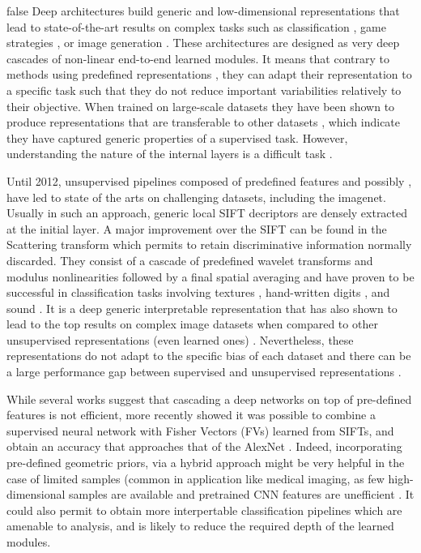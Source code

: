 \documentclass[10pt,twocolumn,letterpaper]{article}
\newcommand{\citep}{\cite}
\begin{document}
\if false
Deep architectures build generic and low-dimensional representations that lead to state-of-the-art results on complex tasks such as classification \citep{he2015deep},  game strategies  \citep{silver2016mastering}, or image generation \citep{radford2015unsupervised}.
These architectures are designed as very deep cascades of non-linear end-to-end learned modules. It means that contrary to methods using predefined representations \cite{ref}, they can adapt their representation to a specific task such that they do not reduce important variabilities relatively to their objective. When trained on large-scale datasets they have been shown to produce representations that are transferable to other datasets \citep{zeiler2014visualizing,huh2016makes}, which indicate they have captured generic properties of a supervised task. However, understanding the nature of the internal layers is a difficult task \citep{szegedy2013intriguing}.

Until 2012, unsupervised pipelines composed of predefined features and possibly , have led to state of the arts on challenging datasets, including the imagenet. Usually in such an approach, generic local \cite{otero2015anatomy} SIFT decriptors  \cite{lowe1999object} are densely extracted at the initial layer. A major improvement over the SIFT can be found in the Scattering transform \cite{} which permits to retain discriminative information normally discarded. They consist of a cascade of  predefined wavelet transforms and modulus nonlinearities followed by a final spatial averaging and have proven to be successful  in classification tasks involving textures \citep{bruna2013invariant,sifre2013rotation}, hand-written digits \citep{bruna2013invariant}, and sound \citep{anden2014deep}. It is a deep generic interpretable representation that has also shown to lead to the top results on complex image datasets when compared to other unsupervised representations (even learned ones) \citep{oyallon2015deep}. Nevertheless, these representations do not adapt to the specific bias of each dataset and there can be a large performance gap between supervised and unsupervised representations \citep{oyallon2015deep}. 

While several works \cite{???} suggest that cascading a deep networks on top of pre-defined features is not efficient, more recently \cite{perronnin2015fisher} showed it was possible to combine a supervised neural network with Fisher Vectors (FVs) learned from SIFTs, and obtain an accuracy that approaches that of the AlexNet \cite{krizhevsky2012imagenet}. 
Indeed, incorporating pre-defined geometric priors, via a hybrid approach might be very helpful in the case of limited samples (common in application like medical imaging, as few high-dimensional samples are available and pretrained CNN features are unefficient \cite{}. It could also permit to obtain more interpertable classification pipelines which are amenable to analysis, and is likely to reduce the required depth of the learned modules.
\end{document}
